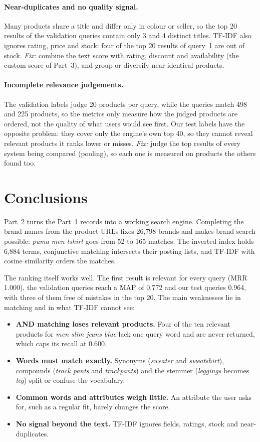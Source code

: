 \documentclass[11pt,a4paper]{article}
\begin{document}
\paragraph{Near-duplicates and no quality signal.} Many products share a title
and differ only in colour or seller, so the top 20 results of the validation
queries contain only 3 and 4 distinct titles. TF-IDF also ignores rating,
price and stock: four of the top 20 results of query~1 are out of stock.
\emph{Fix:} combine the text score with rating, discount and availability (the
custom score of Part~3), and group or diversify near-identical products.

\paragraph{Incomplete relevance judgements.} The validation labels judge 20
products per query, while the queries match 498 and 225 products, so the
metrics only measure how the judged products are ordered, not the quality of
what users would see first. Our test labels have the opposite problem: they
cover only the engine's own top 40, so they cannot reveal relevant products it
ranks lower or misses. \emph{Fix:} judge the top results of every system being
compared (pooling), so each one is measured on products the others found too.

\section{Conclusions}

Part~2 turns the Part~1 records into a working search engine. Completing the
brand names from the product URLs fixes 26{,}798 brands and makes brand search
possible: \emph{puma men tshirt} goes from 52 to 165 matches. The inverted
index holds 6{,}884 terms, conjunctive matching intersects their posting lists,
and TF-IDF with cosine similarity orders the matches.

The ranking itself works well. The first result is relevant for every query
(MRR 1.000), the validation queries reach a MAP of 0.772 and our test queries
0.964, with three of them free of mistakes in the top 20. The main weaknesses lie in matching
and in what TF-IDF cannot see:

\begin{itemize}
  \item \textbf{AND matching loses relevant products.} Four of the ten relevant
    products for \emph{men slim jeans blue} lack one query word and are never
    returned, which caps its recall at 0.600.
  \item \textbf{Words must match exactly.} Synonyms (\emph{sweater} and
    \emph{sweatshirt}), compounds (\emph{track pants} and \emph{trackpants}) and
    the stemmer (\emph{leggings} becomes \emph{leg}) split or confuse the
    vocabulary.
  \item \textbf{Common words and attributes weigh little.} An attribute the user
    asks for, such as a regular fit, barely changes the score.
  \item \textbf{No signal beyond the text.} TF-IDF ignores fields, ratings,
    stock and near-duplicates.
\end{itemize}
\end{document}
